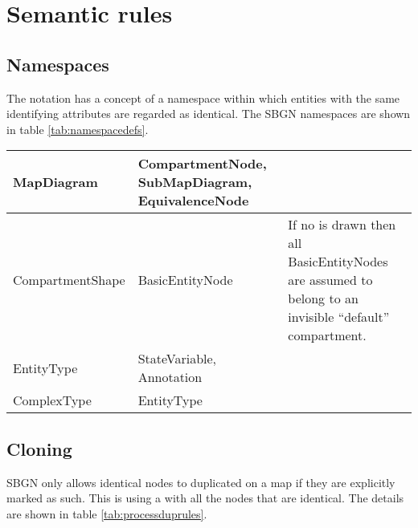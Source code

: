 \section{Semantic rules}

\subsection{Namespaces}

The notation has a concept of a namespace within which entities with the same 
identifying attributes are regarded as identical. The SBGN namespaces are shown 
in table \ref{tab:namespacedefs}.


\begin{center}
\label{tab:namespacedefs}
\begin{small}
\tablelasttail{\hline}
\begin{supertabular}{|l|p{5cm}|p{5cm}|}\hline
%
MapDiagram & CompartmentNode, SubMapDiagram, EquivalenceNode & \\\hline
%
CompartmentShape & BasicEntityNode & If no  is drawn then all BasicEntityNodes are assumed to belong to an invisible ``default'' compartment.\\\hline
EntityType & StateVariable, Annotation & \\\hline
ComplexType & EntityType & \\\hline
\end{supertabular}
\end{small}
\end{center}

\subsection{Cloning}

SBGN only allows identical nodes to duplicated on a map if they are
explicitly marked as such. This is using a  with all the
nodes that are identical. The details are shown in table \ref{tab:processduprules}.


